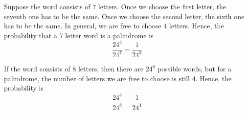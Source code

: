 Suppose the word consists of $7$ letters. Once we choose the first letter, 
the seventh one has to be the same. Once we choose the second letter, the 
sixth one has to be the same. In general, we are free to choose $4$ letters. 
Hence, the probability that a $7$ letter word is a palindrome is 
$$\frac{24^{4}}{24^{7}} = \frac{1}{24^{3}}$$

If the word consists of $8$ letters, then there are $24^{8}$ possible words, 
but for a palindrome, the number of letters we are free to choose is still $4$. 
Hence, the probability is $$\frac{24^{4}}{24^{8}} = \frac{1}{24^{4}}$$